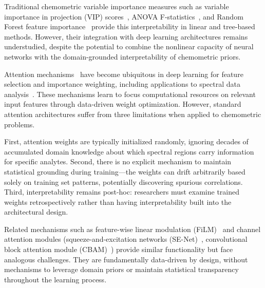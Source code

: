 \documentclass[preprint,12pt]{elsarticle}
\begin{document}
Traditional chemometric variable importance measures such as variable importance in projection (VIP) scores~\cite{chong2005performance}, ANOVA F-statistics~\cite{wold1993pls}, and Random Forest feature importance~\cite{breiman2001random} provide this interpretability in linear and tree-based methods. However, their integration with deep learning architectures remains understudied, despite the potential to combine the nonlinear capacity of neural networks with the domain-grounded interpretability of chemometric priors.


Attention mechanisms~\cite{bahdanau2015neural} have become ubiquitous in deep learning for feature selection and importance weighting, including applications to spectral data analysis~\cite{wang2020spectral,roy2020attention,hong2021spectralformer}. These mechanisms learn to focus computational resources on relevant input features through data-driven weight optimization. However, standard attention architectures suffer from three limitations when applied to chemometric problems.

First, attention weights are typically initialized randomly, ignoring decades of accumulated domain knowledge about which spectral regions carry information for specific analytes. Second, there is no explicit mechanism to maintain statistical grounding during training---the weights can drift arbitrarily based solely on training set patterns, potentially discovering spurious correlations. Third, interpretability remains post-hoc: researchers must examine trained weights retrospectively rather than having interpretability built into the architectural design.

Related mechanisms such as feature-wise linear modulation (FiLM)~\cite{perez2018film} and channel attention modules (squeeze-and-excitation networks (SE-Net)~\cite{hu2018squeeze}, convolutional block attention module (CBAM)~\cite{woo2018cbam}) provide similar functionality but face analogous challenges. They are fundamentally data-driven by design, without mechanisms to leverage domain priors or maintain statistical transparency throughout the learning process.

\end{document}
